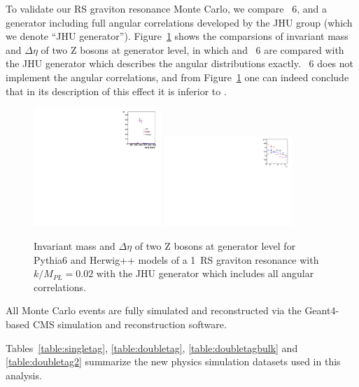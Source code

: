 To validate our RS graviton resonance Monte Carlo, we compare \PYTHIA~6, \HERWIG{++} and 
a generator including full angular correlations developed by the JHU group (which
we denote ``JHU generator'').
Figure~\ref{fig:compare-Herwig++-Pythia6} shows the comparsions of invariant mass and
$\Delta\eta$ of two Z bosons at generator level, in which \HERWIG{++} and
\PYTHIA~6 are compared with the JHU generator which describes the
angular distributions exactly.  \PYTHIA~6 does not implement the angular
correlations, and from Figure~\ref{fig:compare-Herwig++-Pythia6} one can indeed conclude
that in its description of this effect it is inferior to \HERWIG{++}.

\begin{figure}[htb]
\begin{center}
\includegraphics[width=0.43\textwidth]{EXO-12-024/figs/comparison-jhu-pythia-herwigg/MX.pdf}
\includegraphics[width=0.43\textwidth]{EXO-12-024/figs/comparison-jhu-pythia-herwigg/delta-y.pdf}
\end{center}
\caption{Invariant mass and $\Delta\eta$ of two Z bosons at generator level for Pythia6 and Herwig++ models of a 1~\TeVcc RS graviton resonance with $k/M_{PL}=0.02$ with the JHU generator which includes all angular correlations.}
\label{fig:compare-Herwig++-Pythia6}
\end{figure}

All Monte Carlo events are fully simulated and reconstructed via the Geant4-based CMS simulation
 and reconstruction software.

Tables~\ref{table:singletag}, \ref{table:doubletag}, \ref{table:doubletagbulk} and \ref{table:doubletag2} summarize the new 
physics simulation datasets used in this analysis. 




